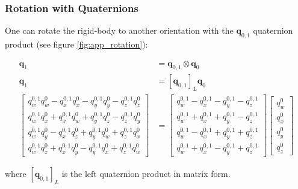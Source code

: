 \documentclass[a4paper]{report}
\numberwithin{figure}{section}
\begin{document}
\subsubsection{Rotation with Quaternions}

One can rotate the rigid-body to another orientation with the 
$\mathbf{q}_{0,1}$ quaternion product (see figure \ref{fig:app_rotation}):

\begin{equation}
\begin{aligned}
  \mathbf{q}_1 &= \mathbf{q}_{0,1} \otimes \mathbf{q}_0\\
  \mathbf{q}_1 &= [\mathbf{q}_{0,1}]_L \mathbf{q}_0\\
  \begin{bmatrix} 
    q_w^{0,1} q_w^0 - q_x^{0,1} q_x^0 - q_y^{0,1} q_y^0 - q_z^{0,1} q_z^0  \\ 
    q_w^{0,1} q_x^0 + q_x^{0,1} q_w^0 + q_y^{0,1} q_z^0 - q_z^{0,1} q_y^0  \\ 
    q_w^{0,1} q_y^0 - q_x^{0,1} q_z^0 + q_y^{0,1} q_w^0 + q_z^{0,1} q_x^0  \\ 
    q_w^{0,1} q_z^0 + q_x^{0,1} q_y^0 - q_y^{0,1} q_x^0 + q_z^{0,1} q_w^0  
  \end{bmatrix} & = 
  \begin{bmatrix} 
    q_w^{0,1} - q_x^{0,1} - q_y^{0,1} - q_z^{0,1}  \\ 
    q_w^{0,1} + q_x^{0,1} + q_y^{0,1} - q_z^{0,1}  \\ 
    q_w^{0,1} - q_x^{0,1} + q_y^{0,1} + q_z^{0,1}  \\ 
    q_w^{0,1} + q_x^{0,1} - q_y^{0,1} + q_z^{0,1}  
  \end{bmatrix}
  \begin{bmatrix} q_w^0 \\ q_x^0 \\ q_y^0 \\ q_z^0 \end{bmatrix}
\end{aligned}
\end{equation}

where $[\mathbf{q}_{0,1}]_L$ is the left quaternion product in matrix form.
\end{document}
